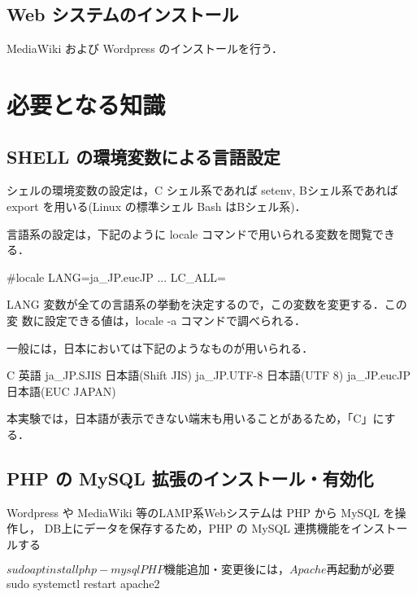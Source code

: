 \subsection*{Web システムのインストール}

MediaWiki および Wordpress のインストールを行う．


\section{必要となる知識}

\subsection{SHELL の環境変数による言語設定}

シェルの環境変数の設定は，C シェル系であれば setenv, Bシェル系であれば
export を用いる(Linux の標準シェル Bash はBシェル系)．

言語系の設定は，下記のように locale コマンドで用いられる変数を閲覧できる．

\begin{cli}
#locale
LANG=ja_JP.eucJP
  ...
LC_ALL=
\end{cli}

LANG 変数が全ての言語系の挙動を決定するので，この変数を変更する．この変
数に設定できる値は，locale -a コマンドで調べられる．

一般には，日本においては下記のようなものが用いられる．

\begin{cli}
C               英語
ja_JP.SJIS      日本語(Shift JIS)
ja_JP.UTF-8     日本語(UTF 8)
ja_JP.eucJP     日本語(EUC JAPAN)
\end{cli}

本実験では，日本語が表示できない端末も用いることがあるため，「C」にする．



\subsection{PHP の MySQL 拡張のインストール・有効化}

Wordpress や MediaWiki 等のLAMP系Webシステムは PHP から MySQL を操作し，
DB上にデータを保存するため，PHP の MySQL 連携機能をインストールする

\begin{cli}
$ sudo apt install php-mysql

PHP機能追加・変更後には，Apache 再起動が必要

$ sudo systemctl restart apache2

\end{cli}

